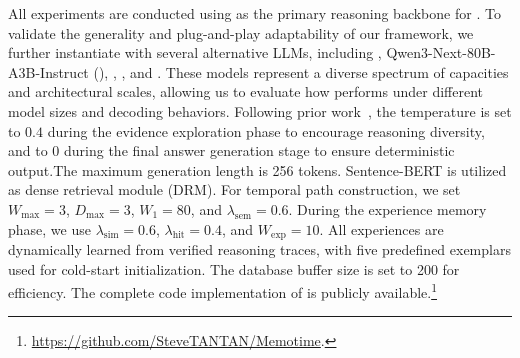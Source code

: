 All experiments are conducted using  as the primary reasoning backbone for \mot. 
To validate the generality and plug-and-play adaptability of our framework, we further instantiate \mot with several alternative LLMs, including , Qwen3-Next-80B-A3B-Instruct (), , , and . 
These models represent a diverse spectrum of capacities and architectural scales, allowing us to evaluate how \mot performs under different model sizes and decoding behaviors.
Following prior work~\cite{pogtan2025paths, tog1.0sun2023think}, the temperature is set to $0.4$ during the evidence exploration phase to encourage reasoning diversity, and to $0$ during the final answer generation stage to ensure deterministic output.The maximum generation length is 256 tokens.
Sentence-BERT \cite{devlin2019bert} is utilized as dense retrieval module (DRM).
For temporal path construction, we set $W_{\max}=3$, $D_{\max}=3$, $W_1=80$, and $\lambda_{\mathrm{sem}}=0.6$.
During the experience memory phase, we use $\lambda_{\mathrm{sim}}=0.6$, $\lambda_{\mathrm{hit}}=0.4$, and $W_{\mathrm{exp}}=10$.
All experiences are dynamically learned from verified reasoning traces, with five predefined exemplars used for cold-start initialization.
The database buffer size is set to 200 for efficiency.
The complete code implementation of \mot is publicly available.\footnote{\url{https://github.com/SteveTANTAN/Memotime}.}




